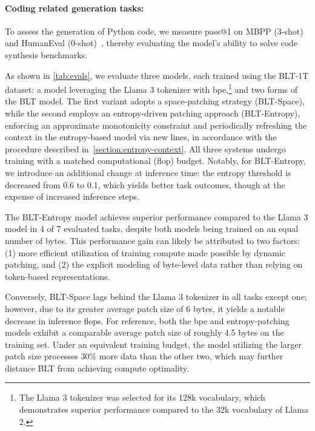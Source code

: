 \paragraph{Coding related generation tasks:}  To assess the generation of Python code, we measure pass@1 on MBPP (3-shot)~\citep{Eval_MBPP} and HumanEval (0-shot)~\citep{Eval_HumanEval}, thereby evaluating the model’s ability to solve code synthesis benchmarks.

As shown in \autoref{tab:evals}, we evaluate three models, each trained using the {\textsc BLT}-1T dataset: a model leveraging the Llama 3 tokenizer with bpe,\footnote{The Llama 3 tokenizer was selected for its 128k vocabulary, which demonstrates superior performance compared to the 32k vocabulary of Llama 2.} and two forms of the {\textsc BLT} model. The first variant adopts a space-patching strategy ({\textsc BLT}-Space), while the second employs an entropy-driven patching approach ({\textsc BLT}-Entropy), enforcing an approximate monotonicity constraint and periodically refreshing the context in the entropy-based model via new lines, in accordance with the procedure described in~\autoref{section:entropy-context}. All three systems undergo training with a matched computational (flop) budget. Notably, for {\textsc BLT}-Entropy, we introduce an additional change at inference time: the entropy threshold is decreased from 0.6 to 0.1, which yields better task outcomes, though at the expense of increased inference steps.

The {\textsc BLT}-Entropy model achieves superior performance compared to the Llama 3 model in 4 of 7 evaluated tasks, despite both models being trained on an equal number of bytes. This performance gain can likely be attributed to two factors: (1) more efficient utilization of training compute made possible by dynamic patching, and (2) the explicit modeling of byte-level data rather than relying on token-based representations.

Conversely, {\textsc BLT}-Space lags behind the Llama 3 tokenizer in all tasks except one; however, due to its greater average patch size of 6 bytes, it yields a notable decrease in inference flops. For reference, both the bpe and entropy-patching models exhibit a comparable average patch size of roughly 4.5 bytes on the training set. Under an equivalent training budget, the model utilizing the larger patch size processes 30\% more data than the other two, which may further distance {\textsc BLT} from achieving compute optimality.

